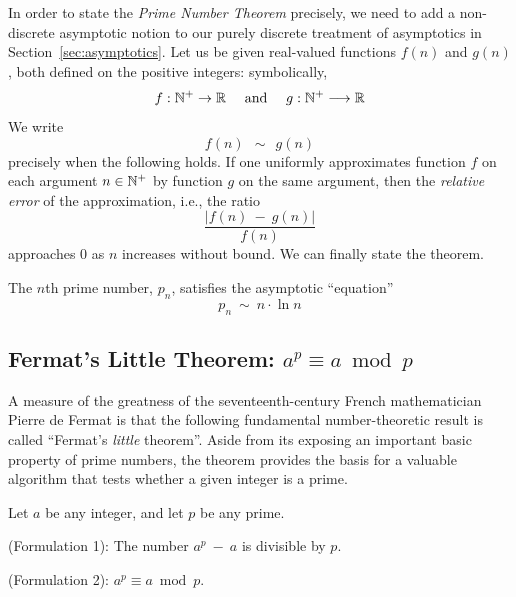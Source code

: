 \smallskip

In order to state the {\it Prime Number Theorem} precisely, we need to add a non-discrete asymptotic notion to our purely discrete treatment of asymptotics in Section~\ref{sec:asymptotics}.  Let us be given real-valued functions $f(n)$ and $g(n)$, both defined on the positive integers: symbolically,
\[
f: \mathbb{N}^+ \rightarrow  \mathbb{R} \ \ \ \mbox{ and } \ \ \
g: \mathbb{N}^+ \longrightarrow  \mathbb{R}
\]
We write
\[ f(n) \ \ \sim \ \ g(n) \]
precisely when the following holds.  If one uniformly approximates function $f$ on each argument $n \in \mathbb{N}^+$ by function $g$ on the same argument, then the {\it relative error} of the approximation, i.e., the ratio
\[ \frac{|f(n) \ - \ g(n)|}{f(n)} \]
approaches $0$ as $n$ increases without bound.  We can finally state the theorem.
\index{approximation, relative error}

\begin{theorem}
\label{thm:prime-number-theorem}
The $n$th prime number, $p_n$, satisfies the asymptotic ``equation'' 
\[ p_{n} \  \sim  \ n \cdot \ln n \]
\end{theorem}
  

\subsection{Fermat's Little Theorem: $a^{p} \equiv a \bmod p$}
\label{sec:fermat}

A measure of the greatness of the seventeenth-century French mathematician Pierre de Fermat is that the following fundamental number-theoretic result is called ``Fermat's {\em little} theorem''.  Aside from its exposing an important basic property of prime numbers, the theorem provides the basis for a valuable algorithm that tests whether a given integer is a prime.

\begin{theorem}
\label{thm:Fermat's-Little-Thm}
Let $a$ be any integer, and let $p$ be any prime.

{\rm (Formulation 1):}
The number $a^p \ - \ a$ is divisible by $p$.

\medskip

{\rm (Formulation 2):}
$a^{p} \equiv a \bmod p$.
\end{theorem}

\smallskip

